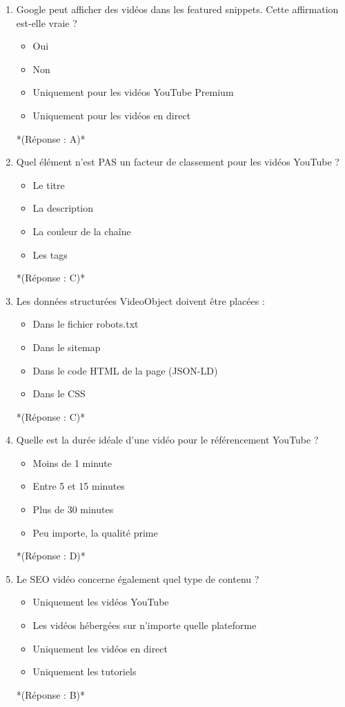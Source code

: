 \documentclass[12pt,a4paper,twoside]{report}
\begin{document}
\begin{enumerate}
    \item Google peut afficher des vidéos dans les featured snippets. Cette affirmation est-elle vraie ?
    \begin{itemize}
        \item[A)] Oui
        \item[B)] Non
        \item[C)] Uniquement pour les vidéos YouTube Premium
        \item[D)] Uniquement pour les vidéos en direct
    \end{itemize}
    *(Réponse : A)*

    \item Quel élément n'est PAS un facteur de classement pour les vidéos YouTube ?
    \begin{itemize}
        \item[A)] Le titre
        \item[B)] La description
        \item[C)] La couleur de la chaîne
        \item[D)] Les tags
    \end{itemize}
    *(Réponse : C)*

    \item Les données structurées VideoObject doivent être placées :
    \begin{itemize}
        \item[A)] Dans le fichier robots.txt
        \item[B)] Dans le sitemap
        \item[C)] Dans le code HTML de la page (JSON-LD)
        \item[D)] Dans le CSS
    \end{itemize}
    *(Réponse : C)*

    \item Quelle est la durée idéale d'une vidéo pour le référencement YouTube ?
    \begin{itemize}
        \item[A)] Moins de 1 minute
        \item[B)] Entre 5 et 15 minutes
        \item[C)] Plus de 30 minutes
        \item[D)] Peu importe, la qualité prime
    \end{itemize}
    *(Réponse : D)*

    \item Le SEO vidéo concerne également quel type de contenu ?
    \begin{itemize}
        \item[A)] Uniquement les vidéos YouTube
        \item[B)] Les vidéos hébergées sur n'importe quelle plateforme
        \item[C)] Uniquement les vidéos en direct
        \item[D)] Uniquement les tutoriels
    \end{itemize}
    *(Réponse : B)*


\end{enumerate}
\end{document}
